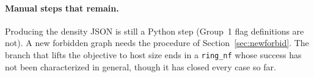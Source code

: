 \documentclass[11pt]{article}
\begin{document}
\paragraph{Manual steps that remain.} Producing the density JSON is still
a Python step (Group~1 flag definitions are not). A new forbidden graph
needs the procedure of Section~\ref{sec:newforbid}. The branch
that lifts the objective to host size ends in a \texttt{ring\_nf} whose
success has not been characterized in general, though it has closed every
case so far.
\end{document}
